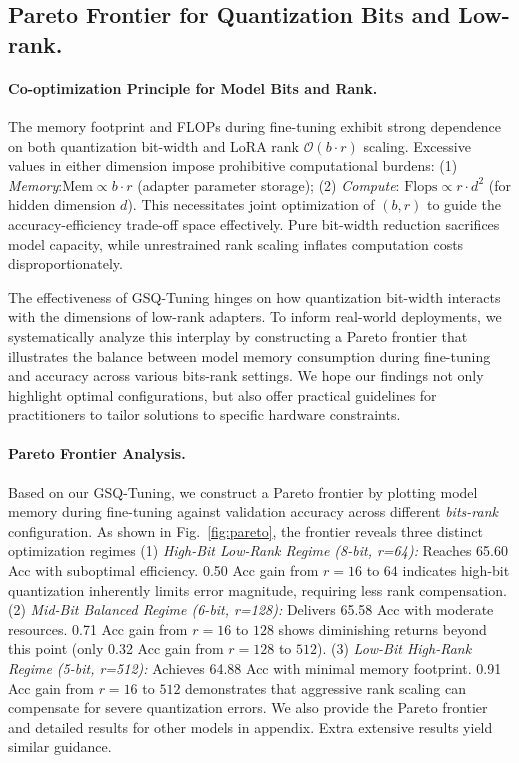 \subsection{Pareto Frontier for Quantization Bits and Low-rank.}
\label{sec:Pareto}


\paragraph{Co-optimization Principle for Model Bits and Rank.} The memory footprint and FLOPs during fine-tuning exhibit strong dependence on both quantization bit-width and LoRA rank $\mathcal{O}(b \cdot r)$ scaling. Excessive values in either dimension impose prohibitive computational burdens: (1) \textit{ Memory}:$\mathrm{Mem} \propto b \cdot r$ (adapter parameter storage); (2) \textit{ Compute}: $\mathrm{Flops} \propto r \cdot d^2$ (for hidden dimension $d$). This necessitates joint optimization of $(b,r)$ to guide the accuracy-efficiency trade-off space effectively. Pure bit-width reduction sacrifices model capacity, while unrestrained rank scaling inflates computation costs disproportionately.

The effectiveness of GSQ-Tuning hinges on how quantization bit-width interacts with the dimensions of low-rank adapters. To inform real-world deployments, we systematically analyze this interplay by constructing a Pareto frontier that illustrates the balance between model memory consumption during fine-tuning and accuracy across various bits-rank settings. We hope our findings not only highlight optimal configurations, but also offer practical guidelines for practitioners to tailor solutions to specific hardware constraints.

\paragraph{Pareto Frontier Analysis.} Based on our GSQ-Tuning, we construct a Pareto frontier by plotting model memory during fine-tuning against validation accuracy across different \textit{bits-rank} configuration. As shown in Fig.~\ref{fig:pareto}, the frontier reveals three distinct optimization regimes (1) \textit{High-Bit Low-Rank Regime (8-bit, r=64):} Reaches 65.60 Acc with suboptimal efficiency. 0.50 Acc gain from $r=16$ to $64$ indicates high-bit quantization inherently limits error magnitude, requiring less rank compensation. (2) \textit{Mid-Bit Balanced Regime (6-bit, r=128):} Delivers 65.58 Acc with moderate resources. 0.71 Acc gain from $r=16$ to $128$ shows diminishing returns beyond this point (only 0.32 Acc gain from $r=128$ to $512$). (3) \textit{Low-Bit High-Rank Regime (5-bit, r=512):}  Achieves 64.88 Acc with minimal memory footprint. 0.91 Acc gain from $r=16$ to $512$ demonstrates that aggressive rank scaling can compensate for severe quantization errors. We also provide the Pareto frontier and detailed results for other models in appendix. Extra extensive results yield similar guidance.

